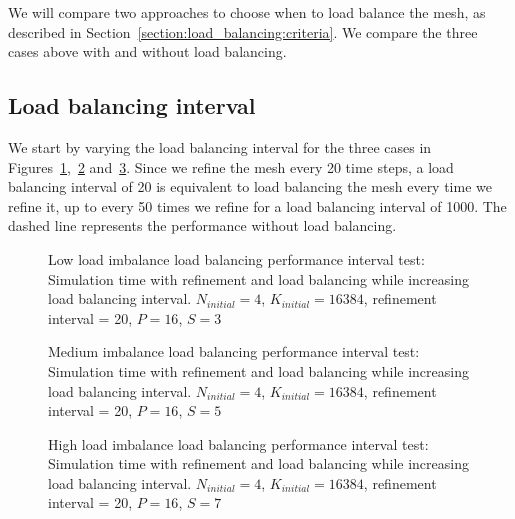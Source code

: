 We will compare two approaches to choose when to load balance the mesh, as described in
Section~\ref{section:load_balancing:criteria}. We compare the three cases above with and without
load balancing.

\subsection{Load balancing interval}\label{subsection:results:load_balancing_performance:interval}

We start by varying the load balancing interval for the three cases in
Figures~\ref{fig:load_balancing_efficiency_interval},~\ref{fig:load_balancing_efficiency_interval_s5}
and~\ref{fig:load_balancing_efficiency_interval_s7}. Since we refine the mesh every 20 time steps, a
load balancing interval of 20 is equivalent to load balancing the mesh every time we refine it, up
to every 50 times we refine for a load balancing interval of 1000. The dashed line represents the
performance without load balancing.

\begin{figure}[H]
	\centering
	
	\caption{Low load imbalance load balancing performance interval test: Simulation time with refinement and load balancing while increasing load balancing interval. \(N_{initial} = 4\), \(K_{initial} = 16384\), refinement interval = 20, \(P = 16\), \(S = 3\)}\label{fig:load_balancing_efficiency_interval}
\end{figure}

\begin{figure}[H]
	\centering
	
	\caption{Medium imbalance load balancing performance interval test: Simulation time with refinement and load balancing while increasing load balancing interval. \(N_{initial} = 4\), \(K_{initial} = 16384\), refinement interval = 20, \(P = 16\), \(S = 5\)}\label{fig:load_balancing_efficiency_interval_s5}
\end{figure}

\begin{figure}[H]
	\centering
	
	\caption{High load imbalance load balancing performance interval test: Simulation time with refinement and load balancing while increasing load balancing interval. \(N_{initial} = 4\), \(K_{initial} = 16384\), refinement interval = 20, \(P = 16\), \(S = 7\)}\label{fig:load_balancing_efficiency_interval_s7}
\end{figure}

